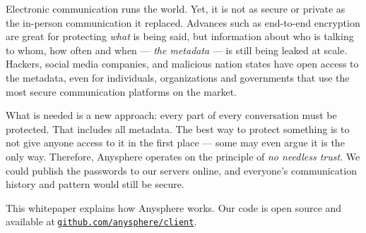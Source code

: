 





Electronic communication runs the world. Yet, it is not as secure or private as the in-person communication it replaced. Advances such as end-to-end encryption are great for protecting \textit{what} is being said, but information about who is talking to whom, how often and when — \textit{the metadata} — is still being leaked at scale. Hackers, social media companies, and malicious nation states have open access to the metadata, even for individuals, organizations and governments that use the most secure communication platforms on the market.

What is needed is a new approach: every part of every conversation must be protected. That includes all metadata. The best way to protect something is to not give anyone access to it in the first place — some may even argue it is the only way. Therefore, Anysphere operates on the principle of \textit{no needless trust}. We could publish the passwords to our servers online, and everyone's communication history and pattern would still be secure.

This whitepaper explains how Anysphere works. Our code is open source and available at$~${\tt \href{https://github.com/anysphere/client}{github.com/anysphere/client}}.